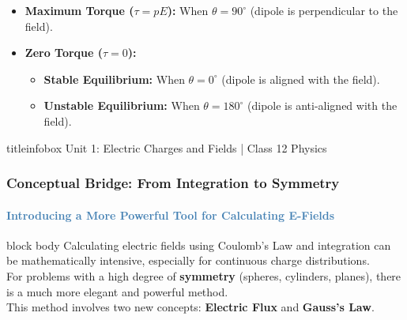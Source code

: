 \begin{frame}
\begin{frame}
\begin{examplebox}
\vspace{0.1cm}
\begin{itemize}
    \item \textbf{Maximum Torque ($\tau = pE$):} When $\theta = 90^\circ$ (dipole is perpendicular to the field).
    \item \textbf{Zero Torque ($\tau = 0$):}
    \begin{itemize}
        \item \textbf{Stable Equilibrium:} When $\theta = 0^\circ$ (dipole is aligned with the field).
        \item \textbf{Unstable Equilibrium:} When $\theta = 180^\circ$ (dipole is anti-aligned with the field).
    \end{itemize}
\end{itemize}
\vspace{0.1cm}
\end{examplebox}

\vfill

\begin{beamercolorbox}[wd=\textwidth,ht=0.5cm,dp=0.1cm,center]{titleinfobox}
    \small\color{coolgray} Unit 1: Electric Charges and Fields | Class 12 Physics
\end{beamercolorbox}
\end{frame}

\begin{frame}
\frametitle{\textsf{\textbf{Conceptual Bridge:} From Integration to Symmetry}}
\framesubtitle{\textcolor{steelblue}{Introducing a More Powerful Tool for Calculating E-Fields}}

\vspace{0.5cm}

\begin{center}
\begin{beamercolorbox}[wd=0.95\textwidth,rounded=true,shadow=true]{block body}
\vspace{0.3cm}
\large
{}\quad Calculating electric fields using Coulomb's Law and integration can be mathematically intensive, especially for continuous charge distributions.
\\[0.5cm]
\quad For problems with a high degree of \textbf{symmetry} (spheres, cylinders, planes), there is a much more elegant and powerful method.
\\[0.5cm]
\quad This method involves two new concepts: \textbf{Electric Flux} and \textbf{Gauss's Law}.
\vspace{0.3cm}
\end{beamercolorbox}
\end{center}


\end{frame}
\end{frame}
